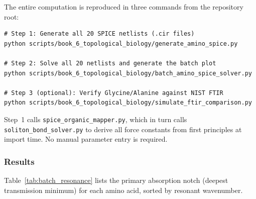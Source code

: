 The entire computation is reproduced in three commands from the repository root:

\begin{verbatim}
# Step 1: Generate all 20 SPICE netlists (.cir files)
python scripts/book_6_topological_biology/generate_amino_spice.py

# Step 2: Solve all 20 netlists and generate the batch plot
python scripts/book_6_topological_biology/batch_amino_spice_solver.py

# Step 3 (optional): Verify Glycine/Alanine against NIST FTIR
python scripts/book_6_topological_biology/simulate_ftir_comparison.py
\end{verbatim}

\noindent Step~1 calls \texttt{spice\_organic\_mapper.py}, which in turn calls \texttt{soliton\_bond\_solver.py} to derive all force constants from first principles at import time. No manual parameter entry is required.

\subsubsection{Results}

Table~\ref{tab:batch_resonance} lists the primary absorption notch (deepest transmission minimum) for each amino acid, sorted by resonant wavenumber.

